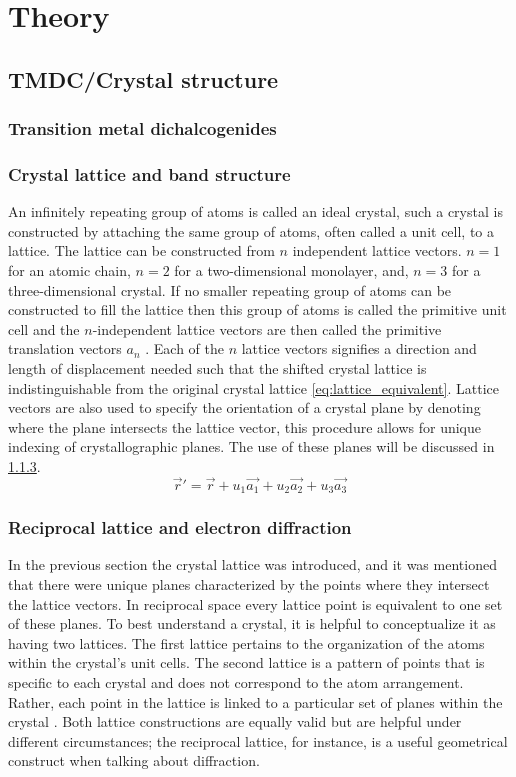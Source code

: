\section{Theory}
\subsection{TMDC/Crystal structure}
\subsubsection{Transition metal dichalcogenides}
\subsubsection{Crystal lattice and band structure}
An infinitely repeating group of atoms is called an ideal crystal, such a crystal is constructed by attaching the same group of atoms, often called a unit cell, to a lattice.
The lattice can be constructed from $n$ independent lattice vectors. $n=1$ for an atomic chain, $n=2$ for a two-dimensional monolayer, and, $n=3$ for a three-dimensional crystal.
If no smaller repeating group of atoms can be constructed to fill the lattice then this group of atoms is called the primitive unit cell and the $n$-independent lattice vectors are then called the primitive translation vectors $a_{n}$ \cite{Kittel1995-qt}.
Each of the $n$ lattice vectors signifies a direction and length of displacement needed such that the shifted crystal lattice is indistinguishable from the original crystal lattice \ref{eq:lattice_equivalent}.
Lattice vectors are also used to specify the orientation of a crystal plane by denoting where the plane intersects the lattice vector, this procedure allows for unique indexing of crystallographic planes. The use of these planes will be discussed in \ref{sec:diffraction}.
\begin{equation}
    \vec{r}' = \vec{r} + u_1 \vec{a_1} +u_2 \vec{a_2} + u_3 \vec{a_3}
    \label{eq:lattice_equivalent}
\end{equation}

\subsubsection{Reciprocal lattice and electron diffraction}
\label{sec:diffraction}
In the previous section the crystal lattice was introduced, and it was mentioned that there were unique planes characterized by the points where they intersect the lattice vectors.
In reciprocal space every lattice point is equivalent to one set of these planes.
To best understand a crystal, it is helpful to conceptualize it as having two lattices. The first lattice pertains to the organization of the atoms within the crystal's unit cells. The second lattice is a pattern of points that is specific to each crystal and does not correspond to the atom arrangement. Rather, each point in the lattice is linked to a particular set of planes within the crystal \cite{Williams2009-ww}.
Both lattice constructions are equally valid but are helpful under different circumstances; the reciprocal lattice, for instance, is a useful geometrical construct when talking about diffraction.

